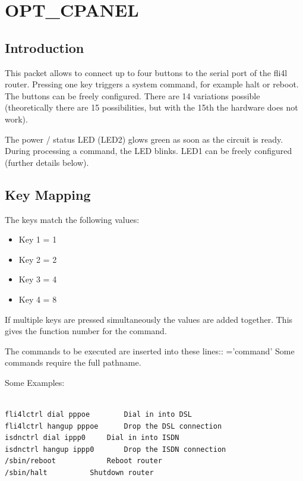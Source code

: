 
{
\section {OPT\_CPANEL}
}

\subsection{Introduction}

This packet allows to connect up to four buttons to the serial port of the fli4l router.
Pressing one key triggers a system command, for example halt or reboot. The buttons can be 
freely configured. There are 14 variations possible (theoretically there are 15 possibilities, but 
with the 15th the hardware does not work). 

The power / status LED (LED2) glows green as soon as the circuit is ready. During 
processing a command, the LED blinks. 
LED1 can be freely configured (further details below).


\subsection{Key Mapping}

The keys match the following values:

\begin{itemize}
    \item Key 1 = 1
    \item Key 2 = 2
    \item Key 3 = 4
    \item Key 4 = 8
\end{itemize}

If multiple keys are pressed simultaneously the values are added together. This gives 
the function number for the command.

The commands to be executed are inserted into these lines::
='command'
Some commands require the full pathname.

Some Examples:
\begin{verbatim}

fli4lctrl dial pppoe		Dial in into DSL
fli4lctrl hangup pppoe		Drop the DSL connection 
isdnctrl dial ippp0		Dial in into ISDN
isdnctrl hangup ippp0		Drop the ISDN connection
/sbin/reboot			Reboot router
/sbin/halt			Shutdown router

\end{verbatim}

